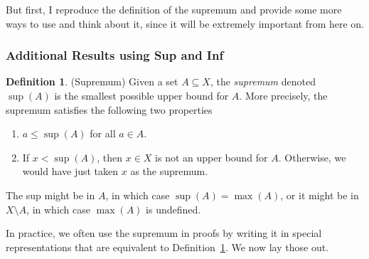 \documentclass[12pt]{book}
\numberwithin{equation}{section} %
\theoremstyle{plain}
\theoremstyle{definition}
\newtheorem{defn}[thm]{Definition}
\theoremstyle{remark}
\begin{document}
But first, I reproduce the definition of the supremum and provide some
more ways to use and think about it, since it will be extremely
important from here on.


\subsubsection{Additional Results using Sup and Inf}

\begin{defn}{(Supremum)}
\label{defn:supdef2}
Given a set $A\subseteq X$, the \emph{supremum} denoted $\sup(A)$ is the
smallest possible upper bound for $A$.
More precisely, the supremum satisfies the following two properties
\begin{enumerate}
  \item $a\leq \sup(A)$ for all $a\in A$.
  \item If $x<\sup(A)$, then $x\in X$ is not an upper bound for $A$.
    Otherwise, we would have just taken $x$ as the supremum.
\end{enumerate}
The sup might be in $A$, in which case $\sup(A) = \max(A)$, or it might
be in $X\setminus A$, in which case $\max(A)$ is undefined.
\end{defn}

In practice, we often use the supremum in proofs by writing it in
special representations that are equivalent to
Definition~\ref{defn:supdef2}. We now lay those out.
\end{document}
